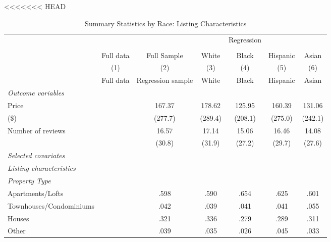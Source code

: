 \small
{
<<<<<<< HEAD
\def\sym#1{\ifmmode^{#1}\else\(^{#1}\)\fi}
\begin{longtable}{l*{6}{c}}
\caption{Summary Statistics by Race: Listing Characteristics}\\
\hline
                  &\multicolumn{1}{c}{}&\multicolumn{1}{c}{}&\multicolumn{1}{c}{}&\multicolumn{1}{c}{Regression}&\multicolumn{1}{c}{}&\multicolumn{1}{c}{}\\
                  		\cline{3-7}\\
                  &\multicolumn{1}{c}{Full data}&\multicolumn{1}{c}{Full Sample}&\multicolumn{1}{c}{White}&\multicolumn{1}{c}{Black}&\multicolumn{1}{c}{Hispanic}&\multicolumn{1}{c}{Asian}\\
                  
                  \hline\hline\endfirsthead\hline\endhead\hline\endfoot\endlastfoot
                  &\multicolumn{1}{c}{(1)}&\multicolumn{1}{c}{(2)}&\multicolumn{1}{c}{(3)}&\multicolumn{1}{c}{(4)}&\multicolumn{1}{c}{(5)}&\multicolumn{1}{c}{(6)}\\
                  &\multicolumn{1}{c}{Full data}&\multicolumn{1}{c}{Regression sample}&\multicolumn{1}{c}{White}&\multicolumn{1}{c}{Black}&\multicolumn{1}{c}{Hispanic}&\multicolumn{1}{c}{Asian}\\
\hline
\endhead                  
\textit{Outcome variables} \\
\hline
Price         &  &           167.37         &           178.62         &           125.95         &           160.39       &   131.06\\
(\$)                  &  &         (277.7)         &         (289.4)         &         (208.1)         &         (275.0)     & (242.1)    \\
[1em]
Number of reviews     &   &      16.57  &      17.14         &      15.06&      16.46 & 	14.08\\
                 &   &     (30.8)         &     (31.9)         &     (27.2)         &     (29.7)        & (27.6) \\
[1em]
\textit{Selected covariates} \\
\hline\hline
\textit{Listing characteristics} \\
\hline
\textit{Property Type} \\
Apartments/Lofts     		&	&      .598         &       .590         &      .654        &      .625 			& 	.601         \\
Townhouses/Condominiums   &  &      .042         &      .039         &      .041        &      .041 	& 		.055         \\
Houses    				&	&      .321         &       .336        &      .279        &      .289				& 		.311         \\
Other    				&	&      .039      &       .035        &      .026        &      .045	& 		.033        \\
[1em]


\end{longtable}}
